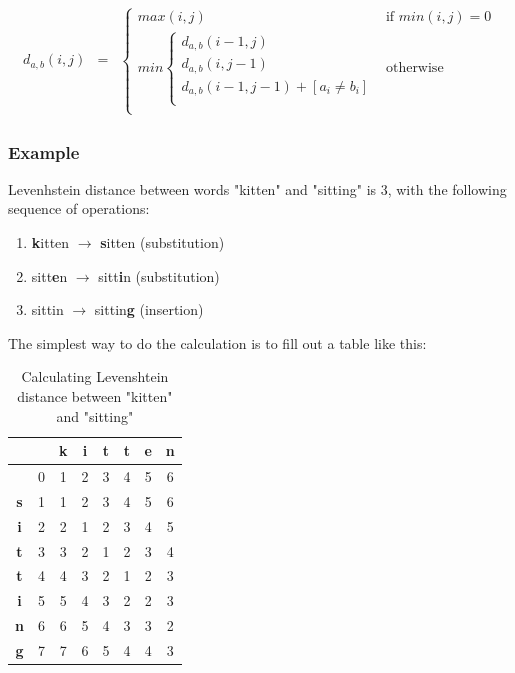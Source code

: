 \documentclass[times, utf8, diplomski]{fer}
\begin{document}
\begin{eqnarray}
	\label{levenshtein}
	d_{a,b}\left(i,j\right) & = & 
							\left\{
								\begin{array}{ll}
								max(i,j) & \mbox{if } min(i,j) = 0\\	
								min\left\{
									\begin{array}{ll}
									d_{a,b}(i-1,j)\\	
									d_{a,b}(i,j-1)\\	
									d_{a,b}(i-1,j-1) + [a_i\ne b_i]\\	
									\end{array}
									\right.&\mbox{otherwise}\\
								\end{array}
							\right.
\end{eqnarray}

\subsubsection{Example}
Levenhstein distance between words "kitten" and "sitting" is 3, with the following sequence of operations:

\begin{enumerate}\itemsep0pt
\item \textbf{k}itten $\rightarrow$ \textbf{s}itten (substitution)
\item sitt\textbf{e}n $\rightarrow$ sitt\textbf{i}n (substitution)
\item sittin $\rightarrow$ sittin\textbf{g} (insertion)
\end{enumerate}
The simplest way to do the calculation is to fill out a table like this:

\begin{table}[H]
\centering
\small
\begin{tabular}{|c|c|c|c|c|c|c|c|}
\hline
	   &   & \textbf{k} & \textbf{i} & \textbf{t} & \textbf{t} & \textbf{e} & \textbf{n}\\
\hline
	   & 0 & 1 & 2 & 3 & 4 & 5 & 6\\
\hline
	 \textbf{s} & 1 & 1 & 2 & 3 & 4 & 5 & 6\\
\hline
	 \textbf{i} & 2 & 2 & 1 & 2 & 3 & 4 & 5\\
\hline
	 \textbf{t} & 3 & 3 & 2 & 1 & 2 & 3 & 4\\
\hline
	 \textbf{t} & 4 & 4 & 3 & 2 & 1 & 2 & 3\\
\hline
	 \textbf{i} & 5 & 5 & 4 & 3 & 2 & 2 & 3\\
\hline
	 \textbf{n} & 6 & 6 & 5 & 4 & 3 & 3 & 2\\
\hline
	 \textbf{g} & 7 & 7 & 6 & 5 & 4 & 4 & 3\\
\hline

\end{tabular}
\caption{Calculating Levenshtein distance between "kitten" and "sitting"}\label{levenshtein.table}
\end{table}
\end{document}
